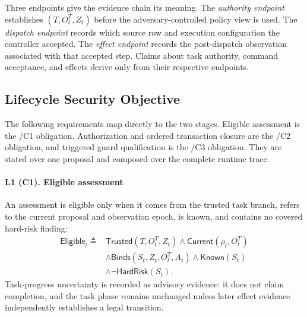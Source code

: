 Three endpoints give the evidence chain its meaning.  The \emph{authority
endpoint} establishes $(T,O_t^T,Z_t)$ before the adversary-controlled policy view
is used.  The \emph{dispatch endpoint} records which source row and execution
configuration the controller accepted.  The \emph{effect endpoint} records the
post-dispatch observation associated with that accepted step.  Claims about task
authority, command acceptance, and effects derive only from their respective
endpoints.

\subsection{Lifecycle Security Objective}

The following requirements map directly to the two stages.  Eligible assessment
is the \lone/C1 obligation.  Authorization and ordered transaction closure are the \ltwoa/C2
obligation, and triggered guard qualification is the \ltwob/C3 obligation.
They are stated over one proposal and composed over the complete runtime trace.

\paragraph{L1 (C1). Eligible assessment}
An assessment is eligible only when it comes from the trusted task branch,
refers to the current proposal and observation epoch, is known, and contains no
covered hard-risk finding:
\begin{align}
\mathsf{Eligible}_t \triangleq{}&
\mathsf{Trusted}(T,O_t^T,Z_t) \land
\mathsf{Current}(\rho_t,O_t^T) \nonumber\\
&\land\mathsf{Binds}(S_t,Z_t,O_t^T,A_t)
\land\mathsf{Known}(S_t) \nonumber\\
&\land\neg\mathsf{HardRisk}(S_t).
\label{eq:eligible}
\end{align}
Task-progress uncertainty is recorded as advisory evidence: it does not
claim completion, and the task phase remains unchanged unless later effect
evidence independently establishes a legal transition.

